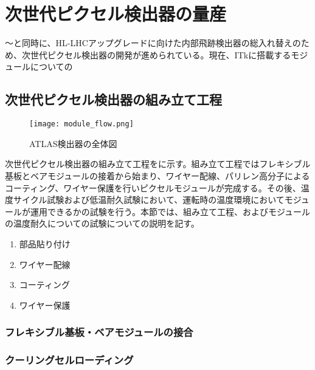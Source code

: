 \chapter{次世代ピクセル検出器の量産}
\label{sec:singatapixel-devel}
〜と同時に、HL-LHCアップグレードに向けた内部飛跡検出器の総入れ替えのため、次世代ピクセル検出器の開発が進められている。現在、ITkに搭載するモジュールについての


\section{次世代ピクセル検出器の組み立て工程}
\label{sec:assemble}
\begin{figure}[tbp]
  \centering
  \texttt{[image: module\_flow.png]}
  \caption[ATLAS検出器]{ATLAS検出器の全体図 \cite{studyofID} }
  \label{fig:assemble}
\end{figure}


次世代ピクセル検出器の組み立て工程をに示す。組み立て工程ではフレキシブル基板とベアモジュールの接着から始まり、ワイヤー配線、パリレン高分子によるコーティング、ワイヤー保護を行いピクセルモジュールが完成する。その後、温度サイクル試験および低温耐久試験において、運転時の温度環境においてモジュールが運用できるかの試験を行う。本節では、組み立て工程、およびモジュールの温度耐久についての試験についての説明を記す。

\begin{enumerate}
  \item 部品貼り付け
  \item ワイヤー配線
  \item コーティング
  \item ワイヤー保護
\end{enumerate}

\subsection{フレキシブル基板・ベアモジュールの接合}

\subsection{クーリングセルローディング}

